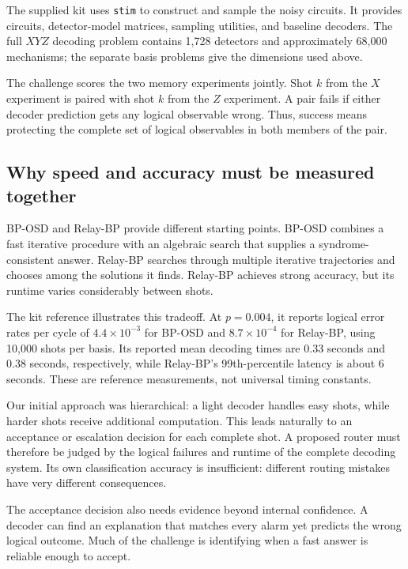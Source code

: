 The supplied kit uses \texttt{stim} to construct and sample the noisy circuits. It provides circuits, detector-model matrices, sampling utilities, and baseline decoders. The full $XYZ$ decoding problem contains 1,728 detectors and approximately 68,000 mechanisms; the separate basis problems give the dimensions used above.

The challenge scores the two memory experiments jointly. Shot $k$ from the $X$ experiment is paired with shot $k$ from the $Z$ experiment. A pair fails if either decoder prediction gets any logical observable wrong. Thus, success means protecting the complete set of logical observables in both members of the pair.

\subsection{Why speed and accuracy must be measured together}

BP-OSD and Relay-BP provide different starting points. BP-OSD combines a fast iterative procedure with an algebraic search that supplies a syndrome-consistent answer. Relay-BP searches through multiple iterative trajectories and chooses among the solutions it finds. Relay-BP achieves strong accuracy, but its runtime varies considerably between shots.

The kit reference illustrates this tradeoff. At $p=0.004$, it reports logical error rates per cycle of $4.4 \times 10^{-3}$ for BP-OSD and $8.7 \times 10^{-4}$ for Relay-BP, using 10,000 shots per basis. Its reported mean decoding times are $0.33$ seconds and $0.38$ seconds, respectively, while Relay-BP's 99th-percentile latency is about 6 seconds. These are reference measurements, not universal timing constants.

Our initial approach was hierarchical: a light decoder handles easy shots, while harder shots receive additional computation. This leads naturally to an acceptance or escalation decision for each complete shot. A proposed router must therefore be judged by the logical failures and runtime of the complete decoding system. Its own classification accuracy is insufficient: different routing mistakes have very different consequences.

The acceptance decision also needs evidence beyond internal confidence. A decoder can find an explanation that matches every alarm yet predicts the wrong logical outcome. Much of the challenge is identifying when a fast answer is reliable enough to accept.

